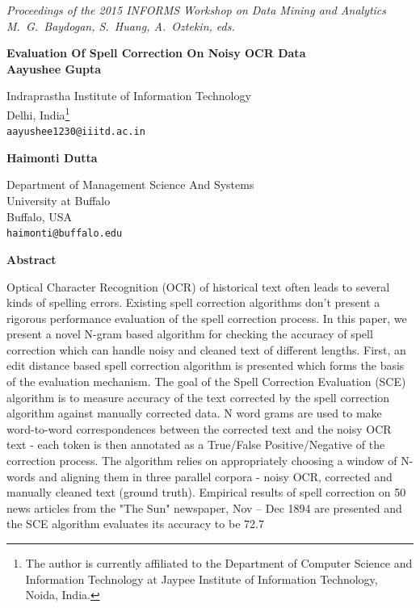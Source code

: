 \documentclass[12pt]{article}
\begin{document}
\noindent
\footnotesize{
\noindent
\textit{Proceedings of the 2015 INFORMS Workshop on Data Mining and Analytics\\
\noindent
M.~G.~Baydogan, S.~Huang, A.~Oztekin, eds.}}

\vspace{0.1in}
\begin{center}
    {\large\bf Evaluation Of Spell Correction On Noisy OCR Data}\\
    \vspace{0.3in}
\textbf{Aayushee Gupta}

Indraprastha Institute of Information Technology\\
Delhi, India\footnote{The author is currently affiliated to the Department of Computer Science and Information Technology at Jaypee Institute of Information Technology, Noida, India.}\\
\texttt{aayushee1230@iiitd.ac.in}\\
\vspace{0.2in}

\textbf{Haimonti Dutta}

Department of Management Science And Systems\\
University at Buffalo\\
Buffalo, USA\\
\texttt{haimonti@buffalo.edu}\\
\end{center}


\begin{center}
    {\bf Abstract}\\

\end{center}
\noindent
Optical Character Recognition (OCR) of historical text often leads to several kinds of spelling errors. Existing spell correction algorithms don't present a rigorous performance evaluation of the spell correction process. In this paper, we present a novel N-gram based algorithm for checking the accuracy of spell correction which can handle noisy and cleaned text of different lengths. First, an edit distance based spell correction algorithm is presented which forms the basis of the evaluation mechanism. The goal of the Spell Correction Evaluation (SCE) algorithm is to measure accuracy of the text corrected by the spell correction algorithm against manually corrected data. N word grams are used to make word-to-word correspondences between the corrected text and the noisy OCR text - each token is then annotated as a True/False Positive/Negative of the correction process. The algorithm relies on appropriately choosing a window of N-words and aligning them in three parallel corpora - noisy OCR, corrected and manually cleaned text (ground truth). Empirical results of spell correction on 50 news articles from the "The Sun" newspaper, Nov – Dec 1894 are presented and the SCE algorithm evaluates its accuracy to be 72.7%
\end{document}
